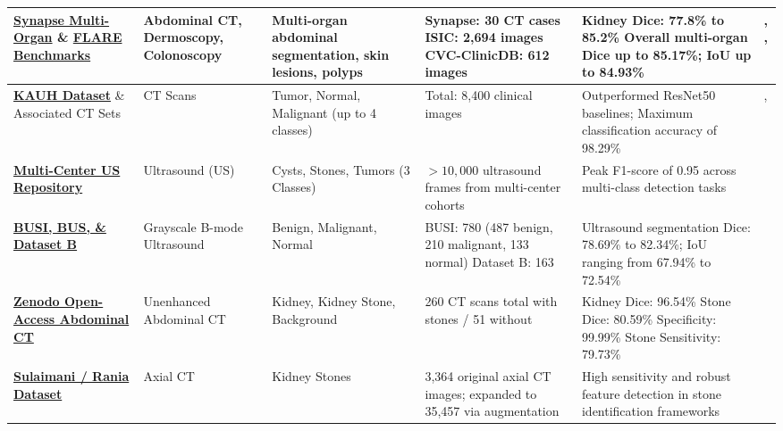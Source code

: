 \begin{longtable}{|L{2.8cm}|L{1.8cm}|L{2.5cm}|L{3.0cm}|L{3.6cm}|L{2.2cm}|}
\hline
\textbf{\href{https://www.synapse.org/#!Synapse:syn3193805/wiki/217789}{Synapse Multi-Organ}} \& \textbf{\href{https://flare.grand-challenge.org/Data/}{FLARE Benchmarks}} & Abdominal CT, Dermoscopy, Colonoscopy & Multi-organ abdominal segmentation, skin lesions, polyps & Synapse: 30 CT cases \newline ISIC: 2,694 images \newline CVC-ClinicDB: 612 images & Kidney Dice: 77.8\% to 85.2\% \newline Overall multi-organ Dice up to 85.17\%; IoU up to 84.93\% & \cite{azad2023daeformer}, \cite{lan2024braunet}, \cite{ma2022flare} \\
\hline
\textbf{\href{https://github.com/DaliaAlzubi/KidneyTumor}{KAUH Dataset}} \& Associated CT Sets & CT Scans & Tumor, Normal, Malignant (up to 4 classes) & Total: 8,400 clinical images & Outperformed ResNet50 baselines; Maximum classification accuracy of 98.29\% & \cite{aljohani2025hierarchical}, \cite{alzubi2022kidney} \\
\hline
\textbf{\href{https://universe.roboflow.com/proyecto-1/tesis-iz9ji}{Multi-Center US Repository}} & Ultrasound (US) & Cysts, Stones, Tumors (3 Classes) & $>10,000$ ultrasound frames from multi-center cohorts & Peak F1-score of 0.95 across multi-class detection tasks & \cite{obaid2025noisy} \\
\hline
\textbf{\href{https://www.sciencedirect.com/science/article/pii/S2352340919312181}{BUSI, BUS, \& Dataset B}} & Grayscale B-mode Ultrasound & Benign, Malignant, Normal & BUSI: 780 (487 benign, 210 malignant, 133 normal) \newline Dataset B: 163 & Ultrasound segmentation Dice: 78.69\% to 82.34\%; IoU ranging from 67.94\% to 72.54\% & \cite{he2023h2former} \\
\hline
\textbf{\href{https://zenodo.org/record/6042410}{Zenodo Open-Access Abdominal CT}} & Unenhanced Abdominal CT & Kidney, Kidney Stone, Background & 260 CT scans total  with stones / 51 without & Kidney Dice: 96.54\% \newline Stone Dice: 80.59\% \newline Specificity: 99.99\% \newline Stone Sensitivity: 79.73\% & \cite{li2022automatic} \\
\hline
\textbf{\href{https://www.kaggle.com/datasets/orvile/axial-ct-imaging-dataset-kidney-stone-detection}{Sulaimani / Rania Dataset}} & Axial CT & Kidney Stones & 3,364 original axial CT images; expanded to 35,457 via augmentation & High sensitivity and robust feature detection in stone identification frameworks & \cite{abdalla2025axial} \\

\end{longtable}
